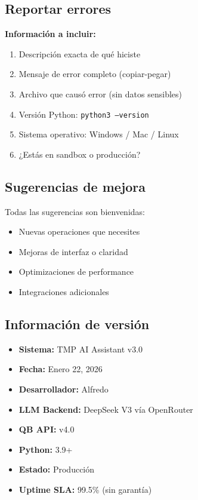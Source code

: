 \documentclass[12pt,oneside]{article}
\begin{document}
\subsection{Reportar errores}

\textbf{Información a incluir:}

\begin{enumerate}
    \item Descripción exacta de qué hiciste
    \item Mensaje de error completo (copiar-pegar)
    \item Archivo que causó error (sin datos sensibles)
    \item Versión Python: \texttt{python3 --version}
    \item Sistema operativo: Windows / Mac / Linux
    \item ¿Estás en sandbox o producción?
\end{enumerate}

\subsection{Sugerencias de mejora}

Todas las sugerencias son bienvenidas:

\begin{itemize}
    \item Nuevas operaciones que necesites
    \item Mejoras de interfaz o claridad
    \item Optimizaciones de performance
    \item Integraciones adicionales
\end{itemize}

\subsection{Información de versión}

\begin{tcolorbox}[colback=lightblue, colframe=darkblue, boxrule=2pt]
    \begin{itemize}
        \item \textbf{Sistema:} TMP AI Assistant v3.0
        \item \textbf{Fecha:} Enero 22, 2026
        \item \textbf{Desarrollador:} Alfredo
        \item \textbf{LLM Backend:} DeepSeek V3 vía OpenRouter
        \item \textbf{QB API:} v4.0
        \item \textbf{Python:} 3.9+
        \item \textbf{Estado:} Producción
        \item \textbf{Uptime SLA:} 99.5\% (sin garantía)
    \end{itemize}
\end{tcolorbox}
\end{document}
